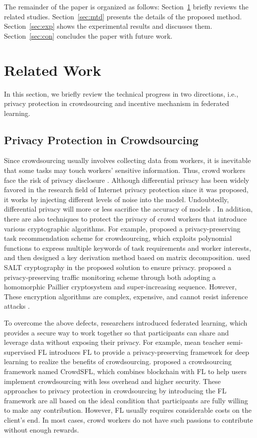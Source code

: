 \documentclass[final,1p,times]{elsarticle}
\begin{document}
The remainder of the paper is organized as follows: Section~\ref{sec:rw} briefly reviews the related studies.  Section~\ref{sec:mtd} presents the details of the proposed method.  Section~\ref{sec:exp} shows the experimental results and discusses them. Section~\ref{sec:con} concludes the paper with future work.

\section{Related Work}\label{sec:rw}
In this section, we briefly review the technical progress in two directions, i.e., privacy protection in crowdsourcing and incentive mechanism in federated learning.

\subsection{Privacy Protection in Crowdsourcing}
Since crowdsourcing usually involves collecting data from workers, it is inevitable that some tasks may touch workers' sensitive information. Thus, crowd workers face the risk of privacy disclosure \citep{xu2019blockchain,zhang2020decentralized}. Although differential privacy \citep{dwork2006differential} has been widely favored in the research field of Internet privacy protection since it was proposed, it works by injecting different levels of noise into the model. Undoubtedly, differential privacy will more or less sacrifice the accuracy of models \citep{bagdasaryan2019differential}. In addition, there are also techniques to protect the privacy of crowd workers that introduce various cryptographic algorithms. For example, \cite{shu2018privacy} proposed a privacy-preserving task recommendation scheme for crowdsourcing, which exploits polynomial functions to express multiple keywords of task requirements and worker interests, and then designed a key derivation method based on matrix decomposition. \cite{joshi2020salt} used SALT cryptography in the proposed solution to ensure privacy. \cite{zhang2019privacy} proposed a privacy-preserving traffic monitoring scheme through both adopting a homomorphic Paillier cryptosystem and super-increasing sequence. However, These encryption algorithms are complex, expensive, and cannot resist inference attacks \citep{lin2020secbcs,wang2019towards}.

To overcome the above defects, researchers introduced federated learning, which provides a secure way to work together so that participants can share and leverage data without exposing their privacy. For example, mean teacher semi-supervised FL \citep{zhang2021toward} introduces FL to provide a privacy-preserving framework for deep learning to realize the benefits of crowdsourcing. \cite{li2020crowdsf} proposed a crowdsourcing framework named CrowdSFL, which combines blockchain with FL to help users implement crowdsourcing with less overhead and higher security. These approaches to privacy protection in crowdsourcing by introducing the FL framework are all based on the ideal condition that participants are fully willing to make any contribution. However, FL usually requires considerable costs on the client's end. In most cases, crowd workers do not have such passions to contribute without enough rewards.
\end{document}
